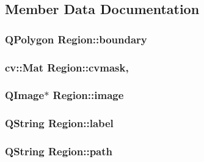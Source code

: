 \subsection{Member Data Documentation}
\hypertarget{class_region_a4a59ef37013f3a6515a79317b0f0b4c0}{
\subsubsection[{boundary}]{\setlength{\rightskip}{0pt plus 5cm}Q\+Polygon Region\+::boundary\hspace{0.3cm}{\ttfamily [private]}}}\label{class_region_a4a59ef37013f3a6515a79317b0f0b4c0}
\hypertarget{class_region_a7ac28a04ed9590f61007073e5e48089f}{
\subsubsection[{cvmask}]{\setlength{\rightskip}{0pt plus 5cm}cv\+::\+Mat Region\+::cvmask\hspace{0.3cm}{\ttfamily [mutable]}, {\ttfamily [private]}}}\label{class_region_a7ac28a04ed9590f61007073e5e48089f}
\hypertarget{class_region_a090b8bc9a8c73f8f874d8d439a0843be}{
\subsubsection[{image}]{\setlength{\rightskip}{0pt plus 5cm}Q\+Image$\ast$ Region\+::image\hspace{0.3cm}{\ttfamily [private]}}}\label{class_region_a090b8bc9a8c73f8f874d8d439a0843be}
\hypertarget{class_region_afcc063386e02be883d71eaf5bcef2a55}{
\subsubsection[{label}]{\setlength{\rightskip}{0pt plus 5cm}Q\+String Region\+::label\hspace{0.3cm}{\ttfamily [private]}}}\label{class_region_afcc063386e02be883d71eaf5bcef2a55}
\hypertarget{class_region_af07da6f0f304272539c1239847280045}{
\subsubsection[{path}]{\setlength{\rightskip}{0pt plus 5cm}Q\+String Region\+::path\hspace{0.3cm}{\ttfamily [private]}}}\label{class_region_af07da6f0f304272539c1239847280045}
